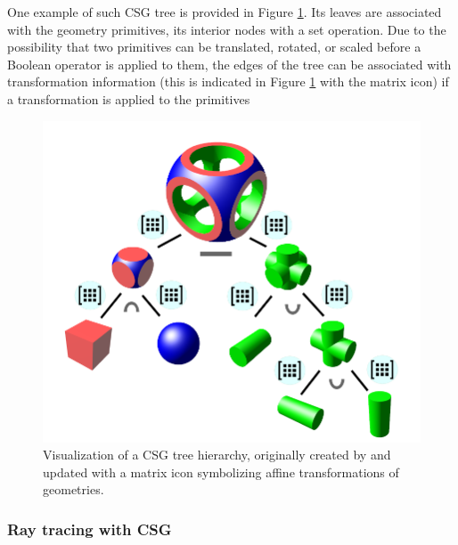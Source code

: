 One example of such CSG tree is provided in Figure \ref{fig:csg_tree}. Its leaves are associated with the geometry primitives, its interior nodes with a set operation. Due to the possibility that two primitives can be translated, rotated, or scaled before a Boolean operator is applied to them, the edges of the tree can be associated with transformation information (this is indicated in Figure \ref{fig:csg_tree} with the matrix icon) if a transformation is applied to the primitives 

\begin{figure}
	\centering
	\includegraphics[width=.9\linewidth]{img/1 fundamentals/csg_tree.png}
	\caption{Visualization of a CSG tree hierarchy, originally created by \cite{csgtree} and updated
	with a matrix icon symbolizing affine transformations of geometries.}
	\label{fig:csg_tree}
\end{figure}

\subsubsection{Ray tracing with CSG}


